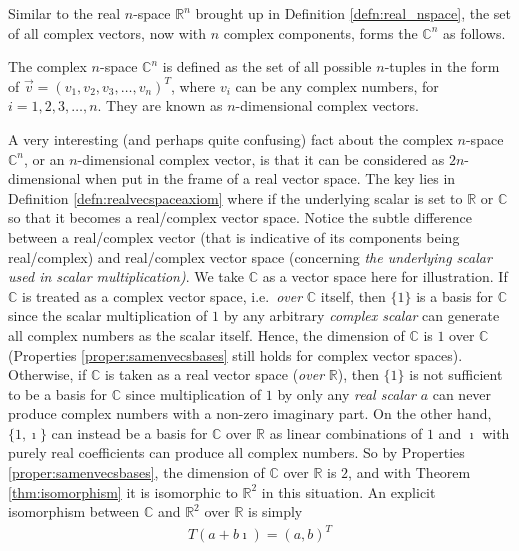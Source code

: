 Similar to the real $n$-space $\mathbb{R}^n$ brought up in Definition \ref{defn:real_nspace}, the set of all complex vectors, now with $n$ complex components, forms the  $\mathbb{C}^n$ as follows.
\begin{defn}
\label{defn:complex_nspace}
The complex $n$-space $\mathbb{C}^n$ is defined as the set of all possible $n$-tuples in the form of $\vec{v} = (v_1, v_2, v_3, \ldots, v_n)^T$, where $v_i$ can be any complex numbers, for $i = 1,2,3,\ldots,n$. They are known as $n$-dimensional complex vectors.
\end{defn}
A very interesting (and perhaps quite confusing) fact about the complex $n$-space $\mathbb{C}^n$, or an $n$-dimensional complex vector, is that it can be considered as $2n$-dimensional when put in the frame of a real vector space. The key lies in Definition \ref{defn:realvecspaceaxiom} where if the underlying scalar is set to $\mathbb{R}$ or $\mathbb{C}$ so that it becomes a real/complex vector space. Notice the subtle difference between a real/complex vector (that is indicative of its components being real/complex) and real/complex vector space (concerning \textit{the underlying scalar used in scalar multiplication)}. We take $\mathbb{C}$ as a vector space here for illustration. If $\mathbb{C}$ is treated as a complex vector space, i.e.\ \textit{over} $\mathbb{C}$ itself, then $\{1\}$ is a basis for $\mathbb{C}$ since the scalar multiplication of $1$ by any arbitrary \textit{complex scalar} can generate all complex numbers as the scalar itself. Hence, the dimension of $\mathbb{C}$ is $1$ over $\mathbb{C}$ (Properties \ref{proper:samenvecsbases} still holds for complex vector spaces). Otherwise, if $\mathbb{C}$ is taken as a real vector space (\textit{over} $\mathbb{R}$), then $\{1\}$ is not sufficient to be a basis for $\mathbb{C}$ since multiplication of $1$ by only any \textit{real scalar} $a$ can never produce complex numbers with a non-zero imaginary part. On the other hand, $\{1, \imath\}$ can instead be a basis for $\mathbb{C}$ over $\mathbb{R}$ as linear combinations of $1$ and $\imath$ with purely real coefficients can produce all complex numbers. So by Properties \ref{proper:samenvecsbases}, the dimension of $\mathbb{C}$ over $\mathbb{R}$ is $2$, and with Theorem \ref{thm:isomorphism} it is isomorphic to $\mathbb{R}^2$ in this situation. An explicit isomorphism between $\mathbb{C}$ and $\mathbb{R}^2$ over $\mathbb{R}$ is simply
\begin{align*}
T(a+b\imath) = (a,b)^T
\end{align*}
